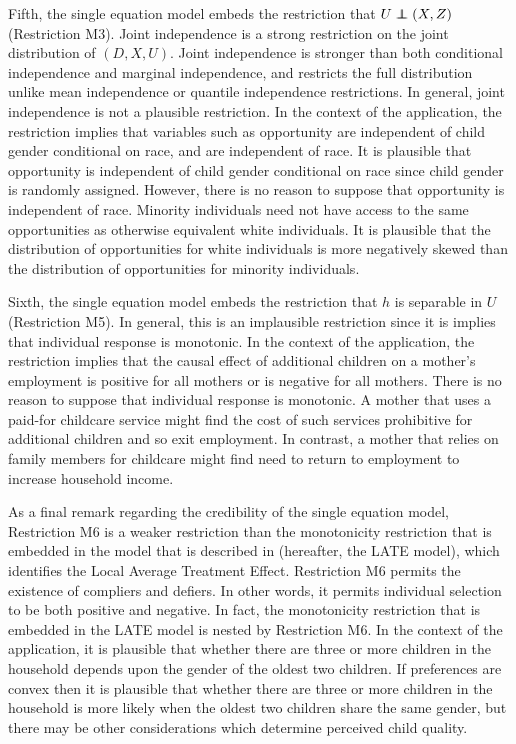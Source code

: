 \documentclass[12pt,a4paper,twoside]{article}
\newcommand\independent{\protect\mathpalette{\protect\independenT}{\perp}}
\def\independenT#1#2{\mathrel{\rlap{$#1#2$}\mkern2mu{#1#2}}}
\numberwithin{equation}{section}
\begin{document}
Fifth, the single equation model embeds the restriction that $U\independent (X,Z)$ (Restriction M3). Joint independence is a strong restriction on the joint distribution of $(D,X,U)$. Joint independence is stronger than both conditional independence and marginal independence, and restricts the full distribution unlike mean independence or quantile independence restrictions. In general, joint independence is not a plausible restriction. In the context of the application, the restriction implies that variables such as opportunity are independent of child gender conditional on race, and are independent of race. It is plausible that opportunity is independent of child gender conditional on race since child gender is randomly assigned. However, there is no reason to suppose that opportunity is independent of race. Minority individuals need not have access to the same opportunities as otherwise equivalent white individuals. It is plausible that the distribution of opportunities for white individuals is more negatively skewed than the distribution of opportunities for minority individuals.  

Sixth, the single equation model embeds the restriction that $h$ is separable in $U$ (Restriction M5). In general, this is an implausible restriction since it is implies that individual response is monotonic. In the context of the application, the restriction implies that the causal effect of additional children on a mother's employment is positive for all mothers or is negative for all mothers. There is no reason to suppose that individual response is monotonic. A mother that uses a paid-for childcare service might find the cost of such services prohibitive for additional children and so exit employment. In contrast, a mother that relies on family members for childcare might find need to return to employment to increase household income.

As a final remark regarding the credibility of the single equation model, Restriction M6 is a weaker restriction than the monotonicity restriction that is embedded in the model that is described in \cite{ai94} (hereafter, the LATE model), which identifies the Local Average Treatment Effect. Restriction M6 permits the existence of compliers and defiers. In other words, it permits individual selection to be both positive and negative. In fact, the monotonicity restriction that is embedded in the LATE model is nested by Restriction M6. In the context of the application, it is plausible that whether there are three or more children in the household depends upon the gender of the oldest two children. If preferences are convex then it is plausible that whether there are three or more children in the household is more likely when the oldest two children share the same gender, but there may be other considerations which determine perceived child quality. 
\end{document}
